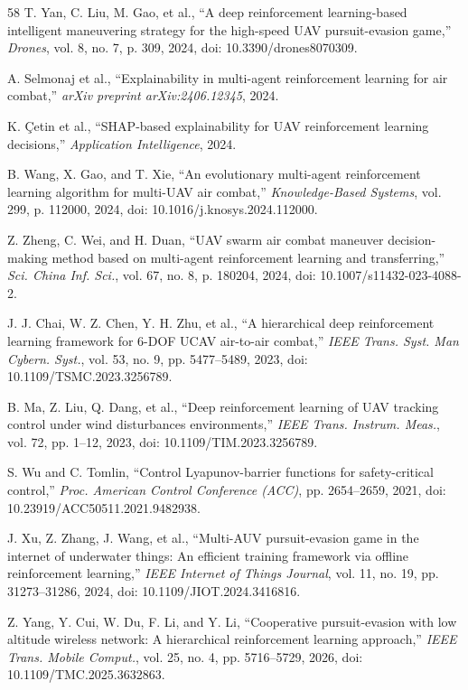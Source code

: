 \documentclass[conference]{IEEEtran}
\begin{document}
\begin{thebibliography}{58}
T. Yan, C. Liu, M. Gao, et al.,
``A deep reinforcement learning-based intelligent maneuvering strategy for the high-speed UAV pursuit-evasion game,''
\emph{Drones}, vol. 8, no. 7, p. 309, 2024,
doi: 10.3390/drones8070309.

A. Selmonaj et al.,
``Explainability in multi-agent reinforcement learning for air combat,''
\emph{arXiv preprint arXiv:2406.12345}, 2024.

K. Çetin et al.,
``SHAP-based explainability for UAV reinforcement learning decisions,''
\emph{Application Intelligence}, 2024.

B. Wang, X. Gao, and T. Xie,
``An evolutionary multi-agent reinforcement learning algorithm for multi-UAV air combat,''
\emph{Knowledge-Based Systems}, vol. 299, p. 112000, 2024,
doi: 10.1016/j.knosys.2024.112000.

Z. Zheng, C. Wei, and H. Duan,
``UAV swarm air combat maneuver decision-making method based on multi-agent reinforcement learning and transferring,''
\emph{Sci. China Inf. Sci.}, vol. 67, no. 8, p. 180204, 2024,
doi: 10.1007/s11432-023-4088-2.

J. J. Chai, W. Z. Chen, Y. H. Zhu, et al.,
``A hierarchical deep reinforcement learning framework for 6-DOF UCAV air-to-air combat,''
\emph{IEEE Trans. Syst. Man Cybern. Syst.}, vol. 53, no. 9, pp. 5477--5489, 2023,
doi: 10.1109/TSMC.2023.3256789.

B. Ma, Z. Liu, Q. Dang, et al.,
``Deep reinforcement learning of UAV tracking control under wind disturbances environments,''
\emph{IEEE Trans. Instrum. Meas.}, vol. 72, pp. 1--12, 2023,
doi: 10.1109/TIM.2023.3256789.

S. Wu and C. Tomlin,
``Control Lyapunov-barrier functions for safety-critical control,''
\emph{Proc. American Control Conference (ACC)}, pp. 2654--2659, 2021,
doi: 10.23919/ACC50511.2021.9482938.

J. Xu, Z. Zhang, J. Wang, et al.,
``Multi-AUV pursuit-evasion game in the internet of underwater things: An efficient training framework via offline reinforcement learning,''
\emph{IEEE Internet of Things Journal}, vol. 11, no. 19, pp. 31273--31286, 2024,
doi: 10.1109/JIOT.2024.3416816.

Z. Yang, Y. Cui, W. Du, F. Li, and Y. Li,
``Cooperative pursuit-evasion with low altitude wireless network: A hierarchical reinforcement learning approach,''
\emph{IEEE Trans. Mobile Comput.}, vol. 25, no. 4, pp. 5716--5729, 2026,
doi: 10.1109/TMC.2025.3632863.



\end{thebibliography}
\end{document}
